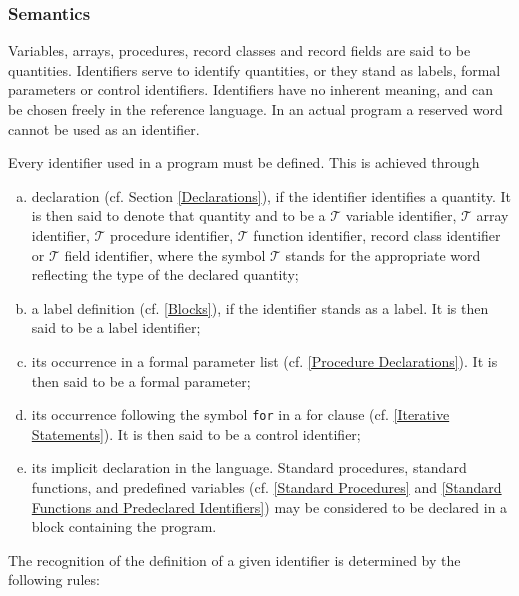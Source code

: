 \documentclass[a4paper]{article}
\makeatletter
\def\SemanticsUnnumbered{\subsubsection*{Semantics}}
\def\IndexAlgolW#1{\index{special}{#1@\A{#1}}}
\def\IndexReservedWord#1{\IndexAlgolW{#1}}
\def\Tee{$\mathscr{T}$ }
\def\A{\lstinline[language=AlgolW,style=ReferenceManual]}
\def\R#1{\lstinline[language=AlgolW,style=ReferenceManual]{#1}}
\def\Ri#1{\IndexReservedWord{#1}\R{#1}}
\makeatother
\begin{document}
\SemanticsUnnumbered

Variables, arrays, procedures, record classes and record fields are
said to be quantities.  Identifiers serve to identify quantities, or
they stand as labels, formal parameters or control identifiers.
Identifiers have no inherent meaning, and can be chosen freely in the
reference language.  In an actual program a reserved word cannot be
used as an identifier.

Every identifier used in a program must be defined. This is achieved
through

\begin{enumerate}[(a)]
\item declaration (cf. Section \ref{Declarations}), if the identifier
  identifies a quantity. It is then said to denote that quantity and
  to be a \Tee variable identifier, \Tee array identifier, \Tee
  procedure identifier, \Tee function identifier, record class
  identifier or \Tee field identifier, where the symbol \Tee
  stands for the appropriate word reflecting the type of the declared
  quantity;

\item a label definition (cf. \ref{Blocks}), if the identifier stands
  as a label. It is then said to be a label identifier;

\item its occurrence in a formal parameter list (cf. \ref{Procedure Declarations}). 
  It is then said to be a formal parameter;

\item its occurrence following the symbol \Ri{for} in a for clause
  (cf. \ref{Iterative Statements}).  It is then said to be a control identifier;

\item its implicit declaration in the language. Standard procedures,
  standard functions, and predefined variables (cf. \ref{Standard Procedures} 
  and \ref{Standard Functions and Predeclared Identifiers}) 
  may be considered to be declared in a block containing the program.
\end{enumerate}

The recognition of the definition of a given identifier is determined
by the following rules:
\end{document}
